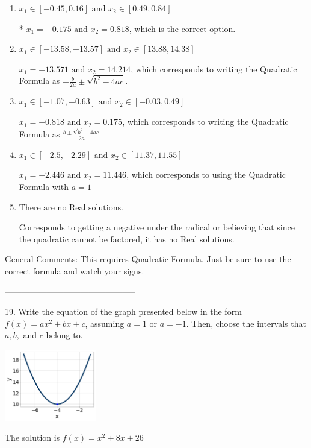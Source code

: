 \documentclass{article}[14pt]
\begin{document}
\begin{enumerate}[label=\Alph*.] 
\item $ x_1 \in [-0.45, 0.16] \text{ and } x_2 \in [0.49, 0.84] $ 

 * $x_1 = -0.175 \text{ and } x_2 = 0.818$, which is the correct option. 
\item $ x_1 \in [-13.58, -13.57] \text{ and } x_2 \in [13.88, 14.38] $ 

  $x_1 = -13.571 \text{ and } x_2 = 14.214$, which corresponds to writing the Quadratic Formula as $-\frac{b}{2a} \pm \sqrt{b^2 - 4ac}$. 
\item $ x_1 \in [-1.07, -0.63] \text{ and } x_2 \in [-0.03, 0.49] $ 

  $x_1 = -0.818 \text{ and } x_2 = 0.175$, which corresponds to writing the Quadratic Formula as $\frac{b \pm \sqrt{b^2 - 4ac}}{2a}$ 
\item $ x_1 \in [-2.5, -2.29] \text{ and } x_2 \in [11.37, 11.55] $ 

  $x_1 = -2.446 \text{ and } x_2 = 11.446$, which corresponds to using the Quadratic Formula with $a=1$ 
\item $ \text{There are no Real solutions.} $ 

 Corresponds to getting a negative under the radical or believing that since the quadratic cannot be factored, it has no Real solutions. 
\end{enumerate} 
 
General Comments: This requires Quadratic Formula. Just be sure to use the correct formula and watch your signs.

-----------------------------------------------

19. Write the equation of the graph presented below in the form $f(x)=ax^2+bx+c$, assuming  $a=1$ or $a=-1$. Then, choose the intervals that $a, b,$ and $c$ belong to.
\begin{center} \includegraphics[width=0.3\textwidth]{../Figures/quadraticGraphToEquationC.png} \end{center} 

The solution is $ f(x) = x^{2} +8 x + 26 $ 
\end{document}
